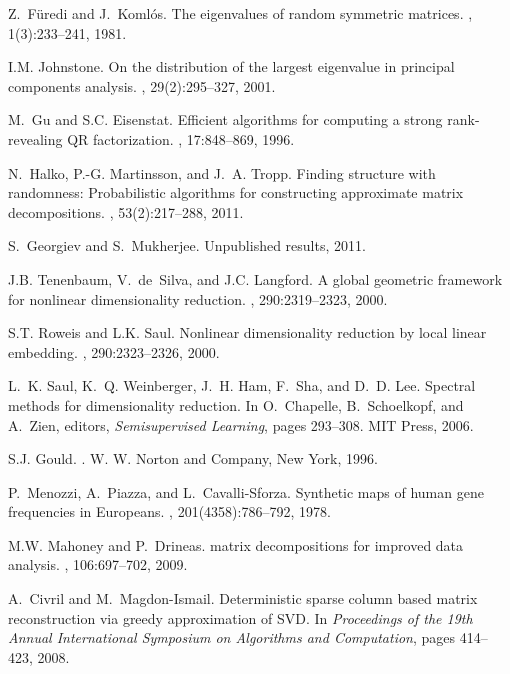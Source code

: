 \documentclass[twoside]{article}
\begin{document}
\begin{small}
\begin{thebibliography}{100}
Z.~F\"{u}redi and J.~Koml\'{o}s.
\newblock The eigenvalues of random symmetric matrices.
, 1(3):233--241, 1981.

I.M. Johnstone.
\newblock On the distribution of the largest eigenvalue in principal components
  analysis.
, 29(2):295--327, 2001.

M.~Gu and S.C. Eisenstat.
\newblock Efficient algorithms for computing a strong rank-revealing {QR}
  factorization.
, 17:848--869, 1996.

N.~Halko, P.-G. Martinsson, and J.~A. Tropp.
\newblock Finding structure with randomness: Probabilistic algorithms for
  constructing approximate matrix decompositions.
, 53(2):217--288, 2011.

S.~Georgiev and S.~Mukherjee.
\newblock Unpublished results, 2011.

J.B. Tenenbaum, V.~de~Silva, and J.C. Langford.
\newblock A global geometric framework for nonlinear dimensionality reduction.
, 290:2319--2323, 2000.

S.T. Roweis and L.K. Saul.
\newblock Nonlinear dimensionality reduction by local linear embedding.
, 290:2323--2326, 2000.

L.~K. Saul, K.~Q. Weinberger, J.~H. Ham, F.~Sha, and D.~D. Lee.
\newblock Spectral methods for dimensionality reduction.
\newblock In O.~Chapelle, B.~Schoelkopf, and A.~Zien, editors, {\em
  Semisupervised Learning}, pages 293--308. MIT Press, 2006.

S.J. Gould.
.
\newblock W. W. Norton and Company, New York, 1996.

P.~Menozzi, A.~Piazza, and L.~Cavalli-Sforza.
\newblock Synthetic maps of human gene frequencies in {E}uropeans.
, 201(4358):786--792, 1978.

M.W. Mahoney and P.~Drineas.
 matrix decompositions for improved data analysis.
, 106:697--702, 2009.

A.~Civril and M.~Magdon-Ismail.
\newblock Deterministic sparse column based matrix reconstruction via greedy
  approximation of {SVD}.
\newblock In {\em Proceedings of the 19th Annual International Symposium on
  Algorithms and Computation}, pages 414--423, 2008.


\end{thebibliography}
\end{small}
\end{document}

